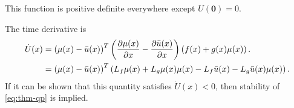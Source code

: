 This function is positive definite everywhere except $U(\mathbf{0}) = 0$.

The time derivative is
\begin{align}
  {\dot U}(x) &= \left(\mu(x) - {\bar u}(x)\right)^T \left(\frac{\partial{\mu(x)}}{\partial{x}} - \frac{\partial{{\bar u}(x)}}{\partial{x}}\right) \left(f(x) + g(x) \mu(x)\right).\\
  \nonumber
  &= \left(\mu(x) - {\bar u}(x)\right)^T \left(L_{f} \mu(x) + L_{g} \mu(x) \mu(x)
  - L_{f} {\bar u}(x) - L_{g} {\bar u}(x) \mu(x) \right).
\end{align}
If it can be shown that this quantity satisfies ${\dot U}(x) < 0$, then stability of \eqref{eq:thm-qp} is implied.
